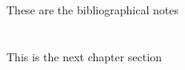 \section*{\NotasBibliograficas}
\TocNotasBibliograficas

These are the bibliographical notes
\citep{ldesc2e}

\medskip



\section*{\ProximoCapitulo}
\TocProximoCapitulo

This is the next chapter section

